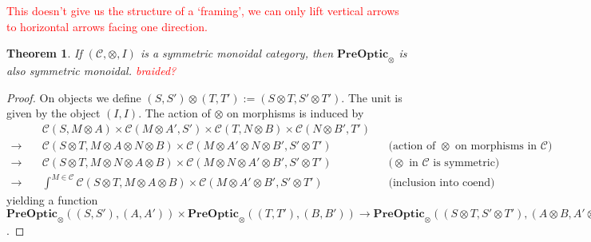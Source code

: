 \documentclass[11pt,a4paper]{article}
\theoremstyle{plain}
\newtheorem{theorem}{Theorem}[section]
\theoremstyle{definition}
\newcommand{\C}{\mathscr{C}}
\newcommand{\PreOptic}{\mathbf{PreOptic}}
\newcommand{\todo}[1]{\textcolor{red}{\small #1}}
\begin{document}
\todo{This doesn't give us the structure of a `framing', we can only lift vertical arrows to horizontal arrows facing one direction.}

\begin{theorem}
If $(\C, \otimes, I)$ is a symmetric monoidal category, then $\PreOptic_\otimes$ is also symmetric monoidal. \todo{braided?}
\end{theorem}
\begin{proof}
On objects we define $(S, S') \otimes (T, T') := (S \otimes T, S' \otimes T')$. The unit is given by the object $(I, I)$. The action of $\otimes$ on morphisms is induced by
\begin{align*}
&\C(S, M \otimes A) \times \C(M \otimes A', S') \times \C(T, N \otimes B) \times \C(N \otimes B', T')\\
\to \quad&\C(S \otimes T, M \otimes A \otimes N \otimes B) \times \C(M \otimes A' \otimes N \otimes B', S' \otimes T') && \text{(action of $\otimes$ on morphisms in $\C$)}\\
\to \quad&\C(S \otimes T, M \otimes N \otimes A \otimes B) \times \C(M \otimes N \otimes A' \otimes B', S' \otimes T') && \text{($\otimes$ in $\C$ is symmetric)}\\
\to \quad&\int^{M \in \C} \C(S \otimes T, M \otimes A \otimes B) \times \C(M \otimes A' \otimes B', S' \otimes T') && \text{(inclusion into coend)}
\end{align*}
yielding a function $\PreOptic_\otimes((S, S'), (A, A')) \times \PreOptic_\otimes((T, T'), (B, B')) \to \PreOptic_\otimes((S \otimes T, S' \otimes T'), (A \otimes B, A' \otimes B'))$. 


\end{proof}
\end{document}
